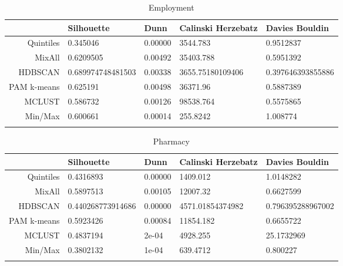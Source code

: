 \documentclass[10pt, a4paper]{article}
\begin{document}
 




\begin{longtable}{rllll}
  \hline
 & Silhouette & Dunn & Calinski Herzebatz & Davies Bouldin \\ 
  \hline
Quintiles & 0.345046 & 0.00000 & 3544.783 & 0.9512837 \\ 
   \hline
MixAll & 0.6209505 & 0.00492 & 35403.788 & 0.5951392 \\ 
   \hline
HDBSCAN & 0.689974748481503 & 0.00338 & 3655.75180109406 & 0.397646393855886 \\ 
   \hline
PAM k-means & 0.625191 & 0.00498 & 36371.96 & 0.5887389 \\ 
   \hline
MCLUST & 0.586732 & 0.00126 & 98538.764 & 0.5575865 \\ 
   \hline
Min/Max & 0.600661 & 0.00014 & 255.8242 & 1.008774 \\ 
   \hline
\hline
\caption{Employment} 
\end{longtable}





 \pagebreak 
 
\begin{longtable}{rllll}
  \hline
 & Silhouette & Dunn & Calinski Herzebatz & Davies Bouldin \\ 
  \hline
Quintiles & 0.4316893 & 0.00000 & 1409.012 & 1.0148282 \\ 
   \hline
MixAll & 0.5897513 & 0.00105 & 12007.32 & 0.6627599 \\ 
   \hline
HDBSCAN & 0.440268773914686 & 0.00000 & 4571.01854374982 & 0.796395288967002 \\ 
   \hline
PAM k-means & 0.5923426 & 0.00084 & 11854.182 & 0.6655722 \\ 
   \hline
MCLUST & 0.4837194 & 2e-04 & 4928.255 & 25.1732969 \\ 
   \hline
Min/Max & 0.3802132 & 1e-04 & 639.4712 & 0.800227 \\ 
   \hline
\hline
\caption{Pharmacy} 
\end{longtable}





 \pagebreak 
 
\end{document}
